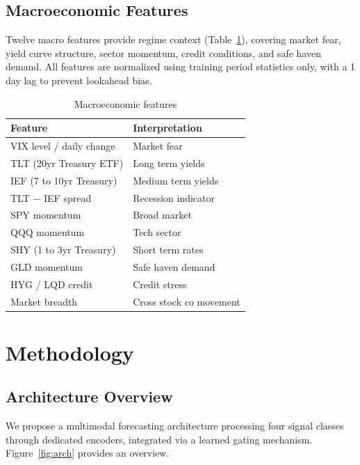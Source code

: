 \documentclass[10pt, twocolumn, a4paper]{article}
\begin{document}
\subsection{Macroeconomic Features}

Twelve macro features provide regime context (Table~\ref{tab:macro}),
covering market fear, yield curve structure, sector momentum, credit
conditions, and safe haven demand. All features are normalized using
training period statistics only, with a 1 day lag to prevent lookahead bias.

\begin{table}[H]
\centering
\small
\caption{Macroeconomic features}
\label{tab:macro}
\begin{tabular}{ll}
\toprule
\textbf{Feature} & \textbf{Interpretation} \\
\midrule
VIX level / daily change  & Market fear \\
TLT (20yr Treasury ETF)   & Long term yields \\
IEF (7 to 10yr Treasury)    & Medium term yields \\
TLT $-$ IEF spread        & Recession indicator \\
SPY momentum              & Broad market \\
QQQ momentum              & Tech sector \\
SHY (1 to 3yr Treasury)     & Short term rates \\
GLD momentum              & Safe haven demand \\
HYG / LQD credit          & Credit stress \\
Market breadth            & Cross stock co movement \\
\bottomrule
\end{tabular}
\end{table}


\section{Methodology}
\label{sec:method}

\subsection{Architecture Overview}

We propose a multimodal forecasting architecture processing four signal
classes through dedicated encoders, integrated via a learned gating
mechanism. Figure~\ref{fig:arch} provides an overview.
\end{document}
